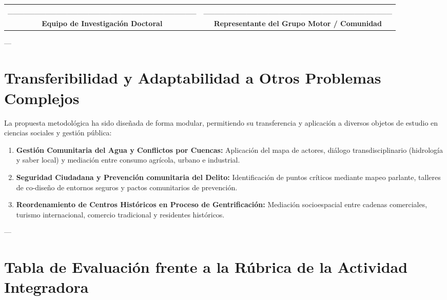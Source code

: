 \documentclass[12pt,a4paper]{article}
\begin{document}
\vspace{0.4cm}
\begin{center}
\small
\begin{tabular}{cc}
___________________________________ & ___________________________________ \\
\textbf{Equipo de Investigación Doctoral} & \textbf{Representante del Grupo Motor / Comunidad} \\
\end{tabular}
\end{center}

---

\section{Transferibilidad y Adaptabilidad a Otros Problemas Complejos}

La propuesta metodológica ha sido diseñada de forma modular, permitiendo su transferencia y aplicación a diversos objetos de estudio en ciencias sociales y gestión pública:

\begin{enumerate}
    \item \textbf{Gestión Comunitaria del Agua y Conflictos por Cuencas:} Aplicación del mapa de actores, diálogo transdisciplinario (hidrología y saber local) y mediación entre consumo agrícola, urbano e industrial.
    \item \textbf{Seguridad Ciudadana y Prevención comunitaria del Delito:} Identificación de puntos críticos mediante mapeo parlante, talleres de co-diseño de entornos seguros y pactos comunitarios de prevención.
    \item \textbf{Reordenamiento de Centros Históricos en Proceso de Gentrificación:} Mediación socioespacial entre cadenas comerciales, turismo internacional, comercio tradicional y residentes históricos.
\end{enumerate}

---

\section{Tabla de Evaluación frente a la Rúbrica de la Actividad Integradora}
\end{document}
